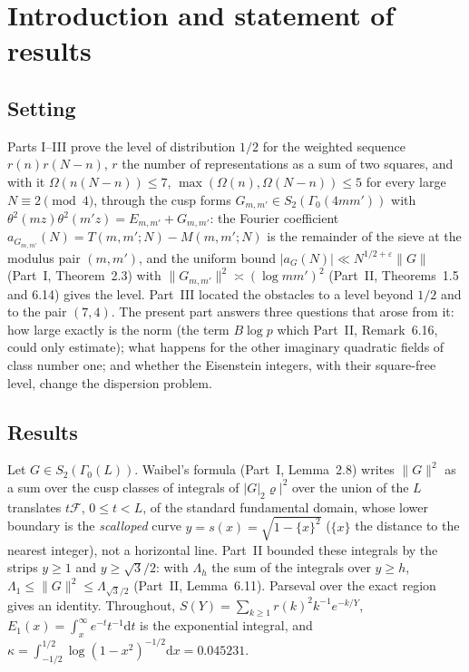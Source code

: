 \documentclass[11pt]{amsart}
\theoremstyle{remark}
\newcommand{\e}{\varepsilon}
\newcommand{\dd}{\mathrm{d}}
\newcommand{\cF}{\mathcal{F}}
\begin{document}
\maketitle
\enlargethispage{4pt}

\section{Introduction and statement of results}\label{sec:intro}

\subsection{Setting}
Parts I--III \cite{ChenI,ChenII,ChenIII} prove the level of distribution $1/2$ for the weighted sequence $r(n)r(N-n)$, $r$ the number of representations as a sum of two squares, and with it $\Omega(n(N-n))\le7$, $\max(\Omega(n),\Omega(N-n))\le5$ for every large $N\equiv2\pmod4$, through the cusp forms $G_{m,m'}\in S_2(\Gamma_0(4mm'))$ with $\theta^2(mz)\theta^2(m'z)=E_{m,m'}+G_{m,m'}$: the Fourier coefficient $a_{G_{m,m'}}(N)=T(m,m';N)-M(m,m';N)$ is the remainder of the sieve at the modulus pair $(m,m')$, and the uniform bound $|a_G(N)|\ll N^{1/2+\e}\|G\|$ (Part~I, Theorem~2.3) with $\|G_{m,m'}\|^2\asymp(\log mm')^2$ (Part~II, Theorems~1.5 and 6.14) gives the level. Part~III located the obstacles to a level beyond $1/2$ and to the pair $(7,4)$. The present part answers three questions that arose from it: how large exactly is the norm (the term $B\log p$ which Part~II, Remark~6.16, could only estimate); what happens for the other imaginary quadratic fields of class number one; and whether the Eisenstein integers, with their square-free level, change the dispersion problem.

\subsection{Results}
Let $G\in S_2(\Gamma_0(L))$. Waibel's formula \cite[(22)]{Waibel} (Part~I, Lemma~2.8) writes $\|G\|^2$ as a sum over the cusp classes of integrals of $|G|_2\varrho|^2$ over the union of the $L$ translates $t\cF$, $0\le t<L$, of the standard fundamental domain, whose lower boundary is the \emph{scalloped} curve $y=s(x)=\sqrt{1-\{x\}^2}$ ($\{x\}$ the distance to the nearest integer), not a horizontal line. Part~II bounded these integrals by the strips $y\ge1$ and $y\ge\sqrt3/2$: with $\Lambda_h$ the sum of the integrals over $y\ge h$, $\Lambda_1\le\|G\|^2\le\Lambda_{\sqrt3/2}$ (Part~II, Lemma~6.11). Parseval over the exact region gives an identity. Throughout, $S(Y)=\sum_{k\ge1}r(k)^2k^{-1}e^{-k/Y}$, $E_1(x)=\int_x^\infty e^{-t}t^{-1}\dd t$ is the exponential integral, and $\kappa=\int_{-1/2}^{1/2}\log(1-x^2)^{-1/2}\dd x=0.045231$.
\end{document}

